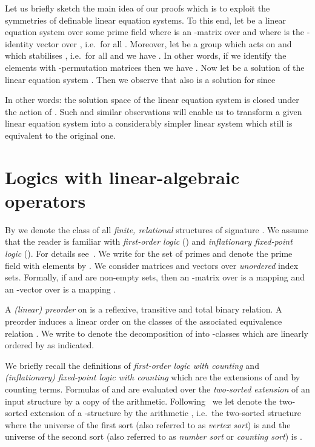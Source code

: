 \documentclass[a4paper,UKenglish]{lipics}
\theoremstyle{plain}
\begin{document}
\bigskip
Let us briefly sketch the main idea of our proofs which is to exploit the 
symmetries of definable linear equation systems. 
To this end, let  be a linear 
equation 
system over some prime field  where  is an -matrix over  and where  is the -identity vector over 
, i.e.\  for all .
Moreover, let  be a group which acts on  and which 
stabilises , i.e.\ for all  and  we have 
. 
In other words, if we identify the elements  with -permutation matrices  then we have .
Now let  be a solution of the linear 
equation system . Then we observe that also  is a solution for  since

In other words: the solution space of the linear equation system  is closed under the action of .
Such and similar observations will enable us to transform a given 
linear equation system into a considerably simpler linear system which still is 
equivalent to the original one. 


\section{Logics with linear-algebraic operators}
\label{sec:logics:linalgop}

By  we denote the class of all \emph{finite, relational} structures 
of signature .
We assume that the reader is familiar with \emph{first-order logic} () and 
\emph{inflationary fixed-point logic} (). For details 
see~\cite{ebbinghaus99finite,FMTbook}.
We write  for the set of primes and denote the prime field with  
elements by . 
We consider matrices and 
vectors over \emph{unordered} index sets. Formally, if 
 and  are non-empty sets, then an -matrix  over  is a mapping  and an -vector  
over  is a mapping .


A \emph{(linear) preorder}  on  is a 
reflexive, transitive and total binary relation. A preorder  induces a 
linear order on the classes of the associated equivalence relation . 
We write  to denote the decomposition 
of  into -classes  which are linearly ordered by  as 
indicated.

We briefly recall the definitions of \emph{first-order logic with 
counting}  and \emph{(inflationary) fixed-point logic with counting} 
 which are the extensions of  and  by counting terms.
Formulas of  and  are evaluated over 
the \emph{two-sorted extension} of an input structure by a copy of the 
arithmetic. Following~\cite{DaGrHoLa09} we let  denote the 
two-sorted extension of a -structure  by the 
arithmetic , i.e.\ the two-sorted structure  where the universe of the first 
sort (also referred to as \emph{vertex sort}) is  and the universe of the 
second sort (also referred to as \emph{number sort} or \emph{counting sort}) is 
.
\end{document}

